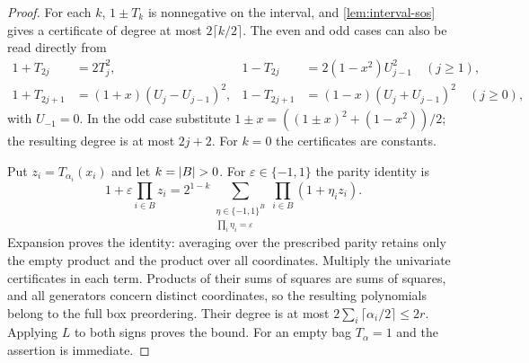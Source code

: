 \begin{proof}
For each $k$, $1\pm T_k$ is nonnegative on the interval, and
\cref{lem:interval-sos} gives a certificate of degree at most
$2\lceil k/2\rceil$. The even and odd cases can also be read directly
from
\[
 \begin{aligned}
 1+T_{2j}&=2T_j^2,&
 1-T_{2j}&=2(1-x^2)U_{j-1}^2\quad(j\ge1),\\
 1+T_{2j+1}&=(1+x)(U_j-U_{j-1})^2,&
 1-T_{2j+1}&=(1-x)(U_j+U_{j-1})^2\quad(j\ge0),
 \end{aligned}
\]
with $U_{-1}=0$. In the odd case substitute
$1\pm x=((1\pm x)^2+(1-x^2))/2$; the resulting degree is at most
$2j+2$. For $k=0$ the certificates are constants.

Put $z_i=T_{\alpha_i}(x_i)$ and let $k=\lvert B\rvert>0$. For
$\varepsilon\in\{-1,1\}$ the parity identity is
\begin{equation}\label{eq:reg-parity}
 1+\varepsilon\prod_{i\in B}z_i
 =2^{1-k}\sum_{\substack{\eta\in\{-1,1\}^B\\
                         \prod_i\eta_i=\varepsilon}}
                   \prod_{i\in B}(1+\eta_i z_i).
\end{equation}
Expansion proves the identity: averaging over the prescribed parity
retains only the empty product and the product over all coordinates.
Multiply the univariate certificates in each term. Products of their
sums of squares are sums of squares, and all generators concern distinct
coordinates, so the resulting polynomials belong to the full box
preordering. Their degree is at most
$2\sum_i\lceil\alpha_i/2\rceil\le2r$. Applying $L$ to both signs
proves the bound. For an empty bag $T_\alpha=1$ and the assertion is
immediate.
\end{proof}

